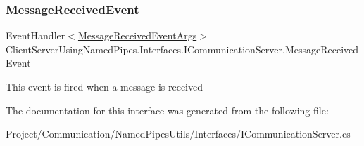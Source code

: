 \subsubsection{\texorpdfstring{Message\+Received\+Event}{MessageReceivedEvent}}
{\footnotesize\ttfamily Event\+Handler$<$\hyperlink{class_client_server_using_named_pipes_1_1_interfaces_1_1_message_received_event_args}{Message\+Received\+Event\+Args}$>$ Client\+Server\+Using\+Named\+Pipes.\+Interfaces.\+I\+Communication\+Server.\+Message\+Received\+Event}



This event is fired when a message is received 



The documentation for this interface was generated from the following file\+:\begin{DoxyCompactItemize}
\item 
Project/\+Communication/\+Named\+Pipes\+Utils/\+Interfaces/I\+Communication\+Server.\+cs\end{DoxyCompactItemize}
